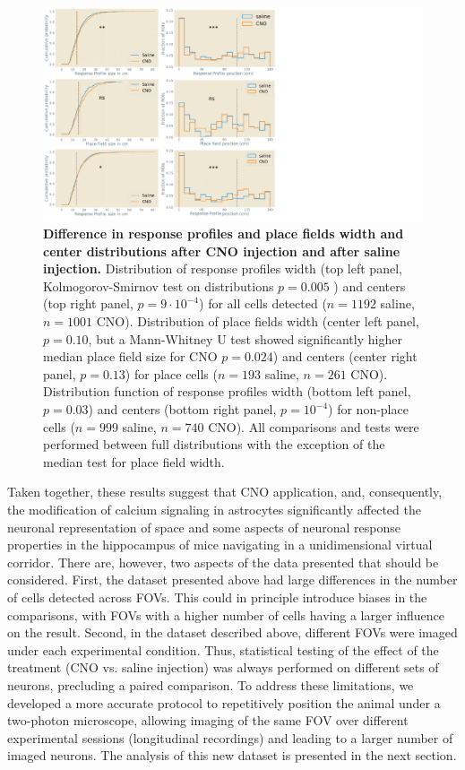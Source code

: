 \begin{figure}[h]
    \centering
    \includegraphics[trim={0 0 360 0},clip,width=\textwidth]{Figures/Chapter4/pf_width_center_2p.pdf}
    \caption[Difference in response profiles and place fields width and center distributions after CNO injection and after saline injection]{\textbf{Difference in response profiles and place fields width and center distributions after CNO injection and after saline injection.} 
    Distribution of response profiles width (top left panel, Kolmogorov-Smirnov test on distributions $p=0.005$ ) and centers (top right panel, $p=9 \cdot 10^{-4}$) for all cells detected ($n=1192$ saline, $n=1001$ CNO). 
    Distribution of place fields width (center left panel, $p=0.10$, but a Mann-Whitney U test showed significantly higher median place field size for CNO $p = 0.024$) and centers (center right panel, $p=0.13$) for place cells ($n=193$ saline, $n=261$ CNO).
    Distribution function of response profiles width (bottom left panel, $p=0.03$) and centers (bottom right panel, $p=10^{-4}$) for non-place cells ($n=999$ saline, $n=740$ CNO). 
    All comparisons and tests were performed between full distributions with the exception of the median test for place field width.}
    \label{fig:chap4:width_center_2p}
\end{figure}
Taken together, these results suggest that CNO application, and, consequently, the modification of calcium signaling in astrocytes significantly affected the neuronal representation of space and some aspects of neuronal response properties in the hippocampus of mice navigating in a unidimensional virtual corridor. 
There are, however, two aspects of the data presented that should be considered. 
First, the dataset presented above had large differences in the number of cells detected across FOVs. 
This could in principle introduce biases in the comparisons, with FOVs with a higher number of cells having a larger influence on the result. 
Second, in the dataset described above, different FOVs were imaged under each experimental condition.
Thus, statistical testing of the effect of the treatment (CNO vs. saline injection) was always performed on different sets of neurons, precluding a paired comparison.
To address these limitations, we developed a more accurate protocol to repetitively position the animal under a two-photon microscope, allowing imaging of the same FOV over different experimental sessions (longitudinal recordings) and leading to a larger number of imaged neurons. 
The analysis of this new dataset is presented in the next section.

